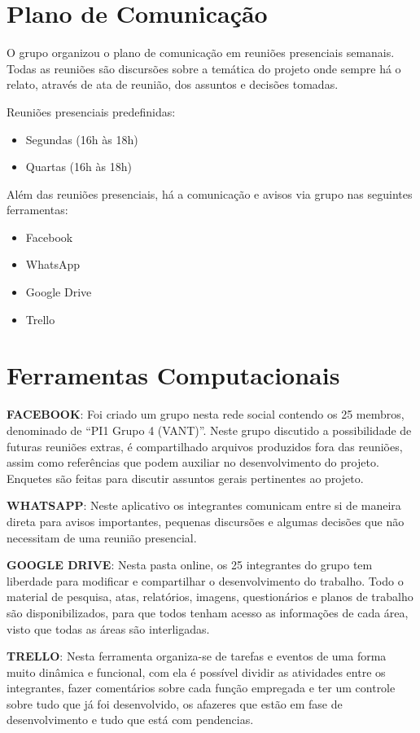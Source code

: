 \section{Plano de Comunicação}
O grupo organizou o plano de comunicação em reuniões presenciais semanais. Todas as reuniões são discursões sobre a temática do projeto onde sempre há o relato, através de ata de reunião, dos assuntos e decisões tomadas. 

Reuniões presenciais predefinidas:
\begin{itemize}
	\item Segundas (16h às 18h)
	\item Quartas (16h às 18h)
\end{itemize}

Além das reuniões presenciais, há a comunicação e avisos via grupo nas seguintes ferramentas:
\begin{itemize}
	\item Facebook
	\item WhatsApp
	\item Google Drive
	\item Trello
\end{itemize}

\section{Ferramentas Computacionais}

\textbf{FACEBOOK}:
Foi criado um grupo nesta rede social contendo os 25 membros, denominado de “PI1 Grupo 4 (VANT)”. Neste grupo discutido a possibilidade de futuras reuniões extras, é compartilhado arquivos produzidos fora das reuniões, assim como referências que podem auxiliar no desenvolvimento do projeto. Enquetes são feitas para discutir assuntos gerais pertinentes ao projeto. 

\textbf{WHATSAPP}: 
Neste aplicativo os integrantes comunicam entre si de maneira direta para avisos importantes, pequenas discursões e algumas decisões que não necessitam de uma reunião presencial.

\textbf{GOOGLE DRIVE}: 
Nesta pasta online, os 25 integrantes do grupo tem liberdade para modificar e compartilhar o desenvolvimento do trabalho. Todo o material de pesquisa, atas, relatórios, imagens, questionários e planos de trabalho são disponibilizados, para que todos tenham acesso as informações de cada área, visto que todas as áreas são interligadas.

\textbf{TRELLO}:
Nesta ferramenta organiza-se de tarefas e eventos de uma forma muito dinâmica e funcional, com ela é possível dividir as atividades entre os integrantes, fazer comentários sobre cada função empregada e ter um controle sobre tudo que já foi desenvolvido, os afazeres que estão em fase de desenvolvimento e tudo que está com pendencias.

